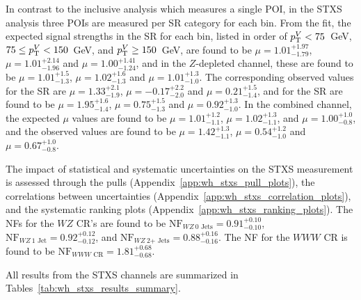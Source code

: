 In contrast to the inclusive analysis which measures a single POI, in the STXS analysis three POIs are measured per SR category for each \ptv{} bin. From the fit, the expected signal strengths in the \zdom{} SR for each \ptv{} bin, listed in order of $p_{\mathrm{T}}^{V} < 75$~GeV, $75 \leq p_{\mathrm{T}}^{V} < 150$~GeV, and $p_{\mathrm{T}}^{V} \geq 150$~GeV, are found to be $\mu = 1.01^{+1.97}_{-1.79}$, $\mu = 1.01^{+2.14}_{-1.96}$ and $\mu = 1.00^{+1.41}_{-1.24}$, and in the $Z$-depleted channel, these are found to be $\mu = 1.01^{+1.5}_{-1.3}$, $\mu = 1.02^{+1.6}_{-1.3}$ and $\mu = 1.01^{+1.3}_{-1.0}$. The corresponding observed values for the \zdom{} SR are $\mu = 1.33^{+2.1}_{-1.9}$, $\mu = -0.17^{+2.2}_{-2.0}$ and $\mu = 0.21^{+1.5}_{-1.4}$, and for the \zdep{} SR are found to be $\mu = 1.95^{+1.6}_{-1.4}$, $\mu = 0.75^{+1.5}_{-1.3}$ and $\mu = 0.92^{+1.3}_{-1.0}$. In the combined \wh{} channel, the expected $\mu$ values are found to be $\mu = 1.01^{+1.2}_{-1.1}$, $\mu = 1.02^{+1.3}_{-1.1}$, and $\mu = 1.00^{+1.0}_{-0.8}$, and the observed values are found to be $\mu = 1.42^{+1.3}_{-1.1}$, $\mu = 0.54^{+1.2}_{-1.0}$ and $\mu = 0.67^{+1.0}_{-0.8}$.

The impact of statistical and systematic uncertainties on the STXS \wh{} measurement is assessed through the pulls (Appendix~\ref{app:wh_stxs_pull_plots}), the correlations between uncertainties (Appendix~\ref{app:wh_stxs_correlation_plots}), and the systematic ranking plots (Appendix~\ref{app:wh_stxs_ranking_plots}). The NFs for the $WZ$ CR's are found to be $\text{NF}_{WZ~\text{0 Jets}} = 0.91^{+0.10}_{-0.10}$, $\text{NF}_{WZ~\text{1 Jet}} = 0.92^{+0.12}_{-0.12}$, and $\text{NF}_{WZ~\text{2+ Jets}} = 0.88^{+0.16}_{-0.16}$. The NF for the $WWW$ CR is found to be $\text{NF}_{WWW \text{ CR}} = 1.81^{+0.68}_{-0.68}$.

All results from the \wh{} STXS channels are summarized in Tables~\ref{tab:wh_stxs_results_summary}.

